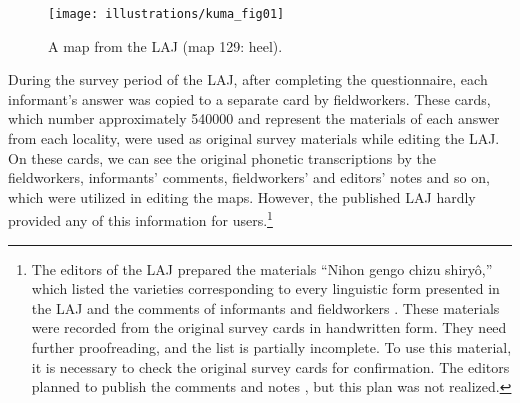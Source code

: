 \documentclass[output=paper]{LSP/langsci}
\begin{document}
\begin{figure} 
\texttt{[image: illustrations/kuma\_fig01]}
\caption{A map from the LAJ (map 129: heel).}          
\label{fig:kuma:1}
\end{figure}  

\largerpage[-3]
During the survey period of the LAJ, after completing the questionnaire, each informant’s answer was copied to a separate card by fieldworkers. These cards, which number approximately 540000 \citep[38, 43]{kokuritsu_kokugo_kenkyujo_nlri_nihon_1966} and represent the materials of each answer from each locality, were used as original survey materials while editing the LAJ. On these cards, we can see the original phonetic transcriptions by the fieldworkers, informants’ comments, fieldworkers’ and editors’ notes and so on, which were utilized in editing the maps. However, the published LAJ hardly provided any of this information for users.\footnote{The editors of the LAJ prepared the materials “Nihon gengo chizu shiryô,” which listed the varieties corresponding to every linguistic form presented in the LAJ and the comments of informants and fieldworkers \citep[32, 33]{kokuritsu_kokugo_kenkyujo_nlri_nihon_1966}. These materials were recorded from the original survey cards in handwritten form. They need further proofreading, and the list is partially incomplete. To use this material, it is necessary to check the original survey cards for confirmation. The editors planned to publish the comments and notes \citep[44]{kokuritsu_kokugo_kenkyujo_nlri_nihon_1966}, but this plan was not realized.}
\end{document}
